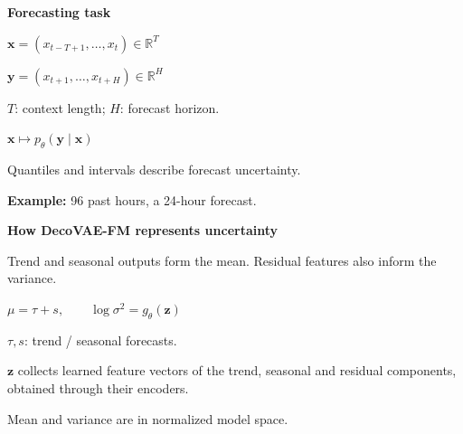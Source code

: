 \documentclass{article}
\begin{document}
\fontsize{12}{17}\selectfont
\noindent
\begin{minipage}[t]{0.48\textwidth}
\raggedright
{\fontsize{13.5}{18}\selectfont\color{teal}\bfseries Forecasting task\par}
\vspace{6pt}
{\fontsize{14}{20}\selectfont
$\mathbf{x}=(x_{t-T+1},\ldots,x_t)\in\mathbb{R}^{T}$\par
$\mathbf{y}=(x_{t+1},\ldots,x_{t+H})\in\mathbb{R}^{H}$\par}
\vspace{3pt}
{\color{muted}$T$: context length; $H$: forecast horizon.\par}
\vspace{7pt}
{\fontsize{15}{21}\selectfont
$\displaystyle \mathbf{x}\longmapsto p_\theta(\mathbf{y}\mid\mathbf{x})$\par}
\vspace{7pt}
{\color{muted}Quantiles and intervals describe forecast uncertainty.\par}
\vspace{8pt}
{\color{muted}\textbf{Example:} 96 past hours, a 24-hour forecast.\par}
\end{minipage}\hfill
\begin{minipage}[t]{0.48\textwidth}
\raggedright
{\fontsize{13.5}{18}\selectfont\color{teal}\bfseries How DecoVAE-FM represents uncertainty\par}
\vspace{6pt}
Trend and seasonal outputs form the mean. Residual features also inform the variance.\par
\vspace{7pt}
{\fontsize{15}{21}\selectfont
$\displaystyle \mu=\tau+s,\qquad \log\sigma^2=g_\theta(\mathbf{z})$\par}
\vspace{7pt}
{\color{muted}
$\tau,s$: trend / seasonal forecasts.\par
\vspace{5pt}
$\mathbf{z}$ collects learned feature vectors of the trend, seasonal and residual components, obtained through their encoders.\par}
\vspace{8pt}
{\color{muted}Mean and variance are in normalized model space.\par}
\end{minipage}
\end{document}
